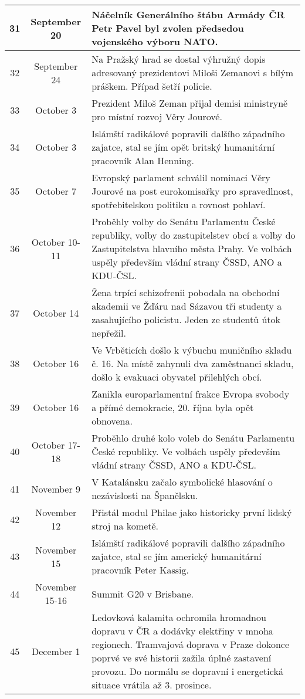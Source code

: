 \begin{tabularx}{\linewidth}{@{}c @{}c X@{}}
31 & September 20 & Náčelník Generálního štábu Armády ČR Petr Pavel byl zvolen předsedou vojenského výboru NATO. \\ \midrule
32 & September 24 & Na Pražský hrad se dostal výhružný dopis adresovaný prezidentovi Miloši Zemanovi s bílým práškem. Případ šetří policie. \\ \midrule
33 & October 3 & Prezident Miloš Zeman přijal demisi ministryně pro místní rozvoj Věry Jourové. \\ \midrule
34 & October 3 & Islámští radikálové popravili dalšího západního zajatce, stal se jím opět britský humanitární pracovník Alan Henning. \\ \midrule
35 & October 7 & Evropský parlament schválil nominaci Věry Jourové na post eurokomisařky pro spravedlnost, spotřebitelskou politiku a rovnost pohlaví. \\ \midrule
36 & October 10-11 & Proběhly volby do Senátu Parlamentu České republiky, volby do zastupitelstev obcí a volby do Zastupitelstva hlavního města Prahy. Ve volbách uspěly především vládní strany ČSSD, ANO a KDU-ČSL. \\ \midrule
37 & October 14 & Žena trpící schizofrenii pobodala na obchodní akademii ve Žďáru nad Sázavou tři studenty a zasahujícího policistu. Jeden ze studentů útok nepřežil. \\ \midrule
38 & October 16 & Ve Vrběticích došlo k výbuchu muničního skladu č. 16. Na místě zahynuli dva zaměstnanci skladu, došlo k evakuaci obyvatel přilehlých obcí. \\ \midrule
39 & October 16 & Zanikla europarlamentní frakce Evropa svobody a přímé demokracie, 20. října byla opět obnovena. \\ \midrule
40 & October 17-18 & Proběhlo druhé kolo voleb do Senátu Parlamentu České republiky. Ve volbách uspěly především vládní strany ČSSD, ANO a KDU-ČSL. \\ \midrule
41 & November 9 & V Katalánsku začalo symbolické hlasování o nezávislosti na Španělsku. \\ \midrule
42 & November 12 & Přistál modul Philae jako historicky první lidský stroj na kometě. \\ \midrule
43 & November 15 & Islámští radikálové popravili dalšího západního zajatce, stal se jím americký humanitární pracovník Peter Kassig. \\ \midrule
44 & November 15-16 & Summit G20 v Brisbane. \\ \midrule
45 & December 1 & Ledovková kalamita ochromila hromadnou dopravu v ČR a dodávky elektřiny v mnoha regionech. Tramvajová doprava v Praze dokonce poprvé ve své historii zažila úplné zastavení provozu. Do normálu se dopravní i energetická situace vrátila až 3. prosince. \\ \midrule

\end{tabularx}
